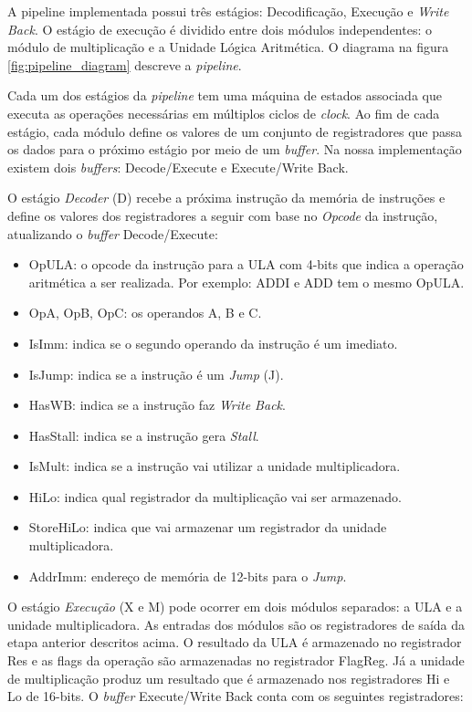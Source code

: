 \documentclass[11pt,a4paper,titlepage]{article}
\begin{document}
A pipeline implementada possui três estágios: Decodificação, Execução e \textit{Write Back}.
O estágio de execução é dividido entre dois módulos independentes: o módulo de multiplicação e a 
Unidade Lógica Aritmética. O diagrama na figura \ref{fig:pipeline_diagram} descreve a \textit{pipeline}.

Cada um dos estágios da \textit{pipeline} tem uma máquina de estados associada que executa as operações
necessárias em múltiplos ciclos de \textit{clock}. Ao fim de cada estágio, cada módulo
define os valores de um conjunto de registradores que passa os dados para o próximo estágio por
meio de um \textit{buffer}. Na nossa implementação existem dois \textit{buffers}: Decode/Execute
e Execute/Write Back.

O estágio \textit{Decoder} (D) recebe a próxima instrução da memória de instruções e define 
os valores dos registradores a seguir com base no \textit{Opcode} da instrução, atualizando
o \textit{buffer} Decode/Execute:

\begin{itemize}
\item OpULA: o opcode da instrução para a ULA com 4-bits que indica a operação aritmética 
a ser realizada. Por exemplo: ADDI e ADD tem o mesmo OpULA.
\item OpA, OpB, OpC: os operandos A, B e C.
\item IsImm: indica se o segundo operando da instrução é um imediato.
\item IsJump: indica se a instrução é um \textit{Jump} (J).
\item HasWB: indica se a instrução faz \textit{Write Back}.
\item HasStall: indica se a instrução gera \textit{Stall}.
\item IsMult: indica se a instrução vai utilizar a unidade multiplicadora.
\item HiLo: indica qual registrador da multiplicação vai ser armazenado.
\item StoreHiLo: indica que vai armazenar um registrador da unidade multiplicadora.
\item AddrImm: endereço de memória de 12-bits para o \textit{Jump}.
\end{itemize}

O estágio \textit{Execução} (X e M) pode ocorrer em dois módulos separados: a ULA e a unidade
multiplicadora. As entradas dos módulos são os registradores de saída da etapa anterior
descritos acima. O resultado da ULA é armazenado no registrador Res e as flags da operação
são armazenadas no registrador FlagReg. Já a unidade de multiplicação produz um resultado
que é armazenado nos registradores Hi e Lo de 16-bits. O \textit{buffer} Execute/Write Back
conta com os seguintes registradores:
\end{document}
